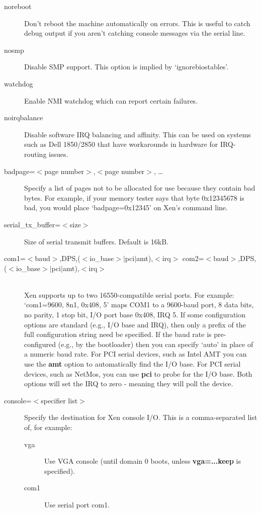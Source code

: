 \documentclass[11pt,twoside,final,openright]{report}
\begin{document}
\begin{description}
\item [ noreboot ] Don't reboot the machine automatically on errors.
  This is useful to catch debug output if you aren't catching console
  messages via the serial line.
\item [ nosmp ] Disable SMP support.  This option is implied by
  `ignorebiostables'.
\item [ watchdog ] Enable NMI watchdog which can report certain
  failures.
\item [ noirqbalance ] Disable software IRQ balancing and affinity.
  This can be used on systems such as Dell 1850/2850 that have
  workarounds in hardware for IRQ-routing issues.
\item [ badpage=$<$page number$>$,$<$page number$>$, \ldots ] Specify
  a list of pages not to be allocated for use because they contain bad
  bytes. For example, if your memory tester says that byte 0x12345678
  is bad, you would place `badpage=0x12345' on Xen's command line.
\item [ serial\_tx\_buffer=$<$size$>$ ] Size of serial transmit
  buffers. Default is 16kB.
\item [ com1=$<$baud$>$,DPS,($<$io\_base$>$$|$pci$|$amt),$<$irq$>$
  com2=$<$baud$>$,DPS,($<$io\_base$>$$|$pci$|$amt),$<$irq$>$] \mbox{}\\
  Xen supports up to two 16550-compatible serial ports.  For example:
  `com1=9600, 8n1, 0x408, 5' maps COM1 to a 9600-baud port, 8 data
  bits, no parity, 1 stop bit, I/O port base 0x408, IRQ 5.  If some
  configuration options are standard (e.g., I/O base and IRQ), then
  only a prefix of the full configuration string need be specified. If
  the baud rate is pre-configured (e.g., by the bootloader) then you
  can specify `auto' in place of a numeric baud rate.
  For PCI serial devices, such as Intel AMT you can use the {\bf amt}
  option to automatically find the I/O base. For PCI serial devices,
  such as NetMos, you can use {\bf pci} to probe for the I/O base.
  Both options will set the IRQ to zero - meaning they will poll the device.
\item [ console=$<$specifier list$>$ ] Specify the destination for Xen
  console I/O.  This is a comma-separated list of, for example:
  \begin{description}
  \item[ vga ] Use VGA console (until domain 0 boots, unless {\bf
  vga=...keep } is specified).
  \item[ com1 ] Use serial port com1.

\end{description}
\end{description}
\end{document}
